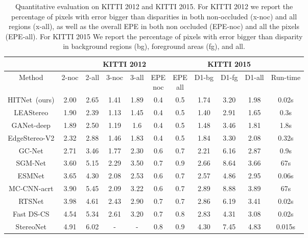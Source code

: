 \documentclass[final]{cvpr}
\newcommand{\algoname}{HITNet}
\begin{document}
\begin{table*}
    \centering
    \begin{tabular}{|c|cccccc|ccc|c|}
    \hline
     & \multicolumn{6}{c|}{KITTI 2012 \cite{Geiger2012CVPR}} & \multicolumn{3}{c|}{ KITTI 2015 \cite{Menze2015ISA} } & \\
    \hline
    Method& 2-noc & 2-all & 3-noc & 3-all & \thead{EPE \\ noc} & \thead{EPE\\all} & D1-bg & D1-fg & D1-all & Run-time \\
    \hline
    \algoname \ (ours) & {2.00} & {2.65} &{1.41}  & {1.89} &  {0.4} & {0.5} & {1.74}  & {3.20} & {1.98} & 0.02s\\
    \hline
    LEAStereo \cite{cheng2020hierarchical} & 1.90 & 2.39 & 1.13 & 1.45 & 0.4 &0.5 & 1.40 & 2.91 & 1.65 & 0.3s \\
    GANet-deep \cite{Zhang2019GANet} & 1.89 & 2.50 & 1.19 & 1.6 & 0.4 &0.5 & 1.48 & 3.46 & 1.81 & 1.8s \\
    EdgeStereo-V2 \cite{song2020edgestereo} & 2.32 & 2.88 & 1.46 & 1.83 & 0.4 & 0.5  & 1.84 & 3.30 & 2.08 & 0.32s \\
    {GC-Net} \cite{kendall2017end} & {2.71} & {3.46} &1.77 & 2.30 & 0.6 & 0.7 & 2.21 & 6.16 & 2.87 & 0.9s \\
    {SGM-Net \cite{sgm-net}}  & 3.60 & 5.15 & 2.29 & 3.50 & 0.7  & 0.9 & 2.66 & 8.64 & 3.66  & 67s\\ 
    {ESMNet \cite{guo2019learning}}	& {3.65} &	{4.30} & {2.08} & {2.53} & {0.6} & {0.7} & 2.57 & 4.86 &	2.95 & 0.06s \\
    {MC-CNN-acrt \cite{zbontar2016stereo}}  & 3.90 & 5.45 & 2.09 & 3.22 & 0.6  & 0.7 & 2.89 & 8.88 & 3.89 & 67s\\
    RTSNet \cite{lee19} & 3.98 & 4.61 & 2.43 & 2.90 & 0.7 & 0.7 & 2.86 & 6.19 & 3.41 & 0.02s \\ 
    {Fast DS-CS \cite{yee2020fast}} & {4.54} & {5.34} & {2.61} & {3.20} & {0.7} &	{0.8} & 2.83 &	4.31 &	3.08 &	0.02s \\
    {StereoNet \cite{stereonet}} & 4.91 & 6.02 & - & - & 0.8 & 0.9 & 4.30 & 7.45 & 4.83 & 0.015s\\
    \hline
    \end{tabular}
    \caption{Quantitative evaluation on KITTI 2012 and KITTI 2015. For KITTI 2012 we report the percentage of pixels with error bigger than  disparities in both non-occluded (x-noc) and all regions (x-all), as well as the overall EPE in both non occluded (EPE-noc) and all the pixels (EPE-all). For KITTI 2015 We report the percentage of pixels with error bigger than  disparity in background regions (bg), foreground areas (fg), and all.}
\label{tab:kitti1215}
\vspace{-3pt}
\end{table*}
\end{document}
